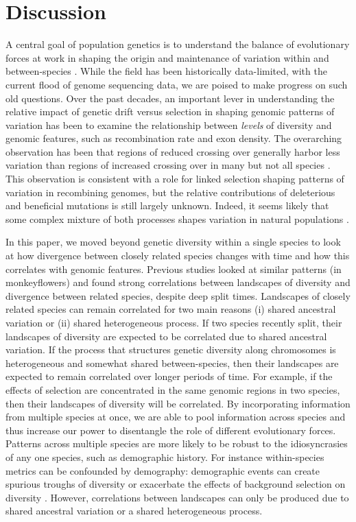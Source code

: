 \section{Discussion}

A central goal of population genetics is to understand the balance of evolutionary forces at work in shaping the origin and maintenance of variation within and between-species \citep{lewontin_genetic_1974}.
While the field has been historically data-limited,
with the current flood of genome sequencing data, we are poised to make progress on such old questions.
Over the past decades, an important lever in understanding
the relative impact of genetic drift versus selection in shaping genomic patterns of variation has been to
examine the relationship between \textit{levels} of diversity and genomic features, such as recombination rate and exon density.
The overarching observation has been that regions of reduced crossing over generally harbor less variation than regions of increased crossing over in many but not all species \parencite[\eg][]{begun_levels_1992, corbett-detig_natural_2015}.
This observation is consistent with a role for linked selection shaping patterns of variation in recombining genomes,
but  the relative contributions of deleterious and
beneficial mutations is still largely unknown.
Indeed, it seems likely that some complex mixture of both processes shapes variation in natural populations \parencite{kern_neutral_2018}.

In this paper,
we moved beyond genetic diversity within a single species to look at how divergence between closely related species changes with time
and how this correlates with genomic features.
Previous studies \citep[\eg][]{stankowski_widespread_2019} looked at similar patterns (in monkeyflowers)
and found strong correlations
between landscapes of diversity and divergence between related species, despite deep split 
times.
Landscapes of closely related species can remain correlated for two main reasons (i) shared ancestral variation 
or (ii) shared heterogeneous process.
If two species recently split, their landscapes of diversity are 
expected to be correlated due to shared ancestral variation.
If the process that structures genetic diversity along chromosomes is 
heterogeneous and somewhat shared between-species, then their landscapes are
expected to remain correlated over longer periods of time.
For example, if the effects of selection are concentrated in the same genomic 
regions in two species, then their landscapes of diversity will be correlated.
By incorporating information from multiple species at once,
we are able to pool information across species and thus increase our power to disentangle the role of different evolutionary forces.
Patterns across multiple species are more likely to be robust to the idiosyncrasies of any one species,
such as demographic history.
For instance within-species metrics can be confounded by demography:
demographic events can create spurious troughs of diversity \citep{simonsen_properties_1995} or exacerbate the effects of background selection on diversity \citep{torres_human_2018}.
However, correlations between landscapes can only be produced due to shared ancestral variation or a shared heterogeneous process.


